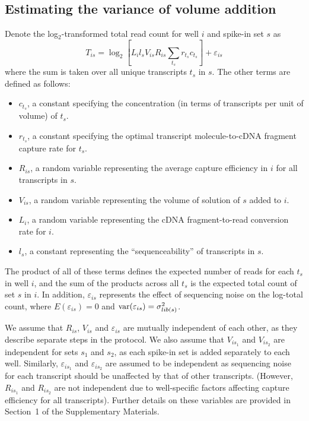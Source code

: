 \documentclass{article}
\newcommand{\suppsecmath}{1}
\begin{document}
\subsection{Estimating the variance of volume addition}
Denote the log$_2$-transformed total read count for well $i$ and spike-in set $s$ as
\[
T_{is} = \log_2 \left[ L_i l_s V_{is} R_{is} \sum_{t_s} r_{t_s} c_{t_s} \right] + \varepsilon_{is}
\]
where the sum is taken over all unique transcripts $t_s$ in $s$.
The other terms are defined as follows:
\begin{itemize}
    \item $c_{t_s}$, a constant specifying the concentration (in terms of transcripts per unit of volume) of $t_s$.
    \item $r_{t_s}$, a constant specifying the optimal transcript molecule-to-cDNA fragment capture rate for $t_s$.
    \item $R_{is}$, a random variable representing the average capture efficiency in $i$ for all transcripts in $s$.
    \item $V_{is}$, a random variable representing the volume of solution of $s$ added to $i$.
    \item $L_i$, a random variable representing the cDNA fragment-to-read conversion rate for $i$.
    \item $l_s$, a constant representing the ``sequenceability'' of transcripts in $s$.
\end{itemize}
The product of all of these terms defines the expected number of reads for each $t_s$ in well $i$, and the sum of the products across all $t_s$ is the expected total count of set $s$ in $i$.
In addition, $\varepsilon_{is}$ represents the effect of sequencing noise on the log-total count, where $E(\varepsilon_{is})=0$ and $\mbox{var}(\varepsilon_{is})= \sigma^2_{lib(s)}$.

We assume that $R_{is}$, $V_{is}$ and $\varepsilon_{is}$ are mutually independent of each other, as they describe separate steps in the protocol.
We also assume that $V_{is_1}$ and $V_{is_2}$ are independent for sets $s_1$ and $s_2$, as each spike-in set is added separately to each well.
Similarly, $\varepsilon_{is_1}$ and $\varepsilon_{is_2}$ are assumed to be independent as sequencing noise for each transcript should be unaffected by that of other transcripts.
(However, $R_{is_1}$ and $R_{is_2}$ are not independent due to well-specific factors affecting capture efficiency for all transcripts).
Further details on these variables are provided in Section~\suppsecmath{} of the Supplementary Materials.
\end{document}

